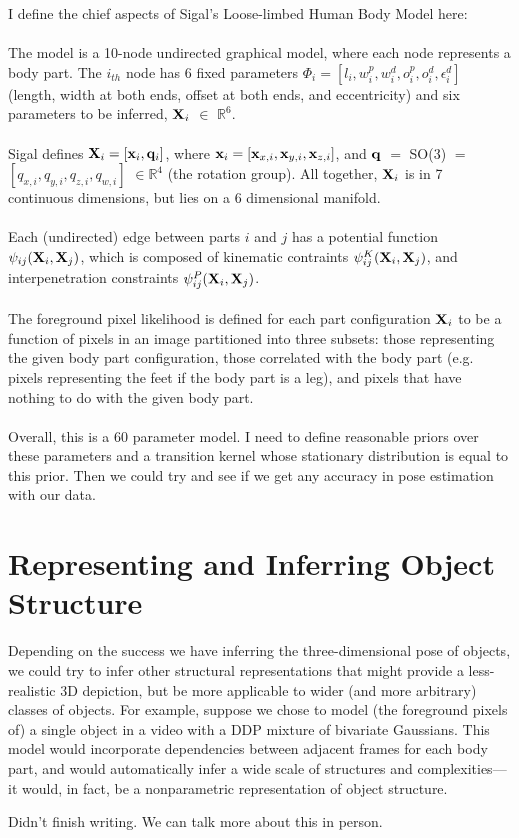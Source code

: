 \documentclass{article}
\begin{document}
I define the chief aspects of Sigal's Loose-limbed Human Body Model here:\\ \\
The model is a 10-node undirected graphical model, where each node represents a body part. The $i_{th}$ node has 6 fixed parameters $\Phi_{i} = [l_{i},w_{i}^{p}, w_{i}^d, o_{i}^{p}, o_{i}^{d}, \epsilon_{i}^{d}]$ (length, width at both ends, offset at both ends, and eccentricity) and six parameters to be inferred, $\bold{X}_{i}$ $\in$ $\mathbb{R}^6$.\\\\
Sigal defines $\bold{X}_{i} = [\bold{x}_{i},\bold{q}_{i}]$, where $\bold{x}_{i} = [\bold{x}_{x,i}, \bold{x}_{y,i}, \bold{x}_{z,i}]$, and $\bold{q}$ $=$ SO(3) $=$ $[q_{x,i},q_{y,i},q_{z,i},q_{w,i}]$ $\in \mathbb{R}^{4}$ (the rotation group). All together, $\bold{X}_{i}$ is in 7 continuous dimensions, but lies on a 6 dimensional manifold.\\\\
Each (undirected) edge between parts $i$ and $j$ has a potential function $\psi_{ij}(\bold{X}_{i}, \bold{X}_{j})$, which is composed of kinematic contraints $\psi_{ij}^{K}(\bold{X}_{i}, \bold{X}_{j})$, and interpenetration constraints $\psi_{ij}^{P}(\bold{X}_{i}, \bold{X}_{j})$.\\\\
The foreground pixel likelihood is defined for each part configuration $\bold{X}_{i}$ to be a function of pixels in an image partitioned into three subsets: those representing the given body part configuration, those correlated with the body part (e.g. pixels representing the feet if the body part is a leg), and pixels that have nothing to do with the given body part. \\\\
Overall, this is a 60 parameter model. I need to define reasonable priors over these parameters and a transition kernel whose stationary distribution is equal to this prior. Then we could try and see if we get any accuracy in pose estimation with our data.




\section{Representing and Inferring Object Structure}

Depending on the success we have inferring the three-dimensional pose of objects, we could try to infer other structural representations that might provide a less-realistic 3D depiction, but be more applicable to wider (and more arbitrary) classes of objects. For example, suppose we chose to model (the foreground pixels of) a single object in a video with a DDP mixture of bivariate Gaussians. This model would incorporate dependencies between adjacent frames for each body part, and would automatically infer a wide scale of structures and complexities---it would, in fact, be a nonparametric representation of object structure.

Didn't finish writing. We can talk more about this in person.

\begin{small}

 
\end{small}
\end{document}
